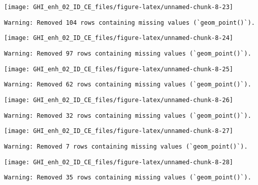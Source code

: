 \documentclass[
  10pt,
  a4paper,oneside]{article}
\begin{document}
\begin{center}\texttt{[image: GHI\_enh\_02\_ID\_CE\_files/figure-latex/unnamed-chunk-8-23]} \end{center}

\begin{verbatim}
Warning: Removed 104 rows containing missing values (`geom_point()`).
\end{verbatim}

\begin{center}\texttt{[image: GHI\_enh\_02\_ID\_CE\_files/figure-latex/unnamed-chunk-8-24]} \end{center}

\begin{verbatim}
Warning: Removed 97 rows containing missing values (`geom_point()`).
\end{verbatim}

\begin{center}\texttt{[image: GHI\_enh\_02\_ID\_CE\_files/figure-latex/unnamed-chunk-8-25]} \end{center}

\begin{verbatim}
Warning: Removed 62 rows containing missing values (`geom_point()`).
\end{verbatim}

\begin{center}\texttt{[image: GHI\_enh\_02\_ID\_CE\_files/figure-latex/unnamed-chunk-8-26]} \end{center}

\begin{verbatim}
Warning: Removed 32 rows containing missing values (`geom_point()`).
\end{verbatim}

\begin{center}\texttt{[image: GHI\_enh\_02\_ID\_CE\_files/figure-latex/unnamed-chunk-8-27]} \end{center}

\begin{verbatim}
Warning: Removed 7 rows containing missing values (`geom_point()`).
\end{verbatim}

\begin{center}\texttt{[image: GHI\_enh\_02\_ID\_CE\_files/figure-latex/unnamed-chunk-8-28]} \end{center}

\begin{verbatim}
Warning: Removed 35 rows containing missing values (`geom_point()`).
\end{verbatim}
\end{document}
